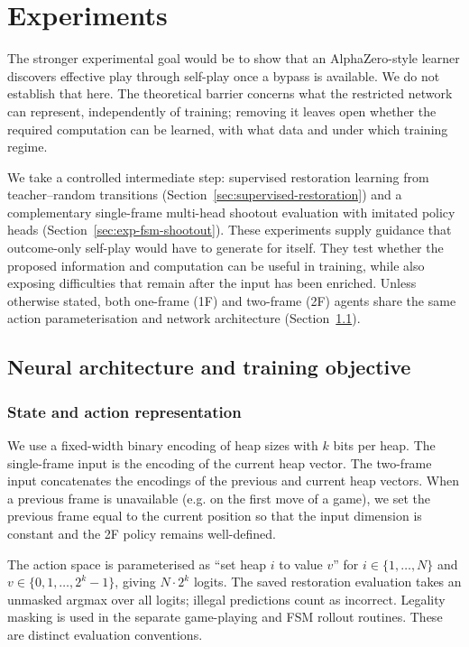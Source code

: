 \documentclass[11pt]{article}
\theoremstyle{plain}
\theoremstyle{definition}
\theoremstyle{remark}
\numberwithin{equation}{section}
\begin{document}
\section{Experiments}
\label{sec:experiments}

The stronger experimental goal would be to show that an AlphaZero-style learner discovers effective play through self-play once a bypass is available. We do not establish that here. The theoretical barrier concerns what the restricted network can represent, independently of training; removing it leaves open whether the required computation can be learned, with what data and under which training regime.

We take a controlled intermediate step: supervised restoration learning from teacher--random transitions (Section~\ref{sec:supervised-restoration}) and a complementary single-frame multi-head shootout evaluation with imitated policy heads (Section~\ref{sec:exp-fsm-shootout}). These experiments supply guidance that outcome-only self-play would have to generate for itself. They test whether the proposed information and computation can be useful in training, while also exposing difficulties that remain after the input has been enriched.
Unless otherwise stated, both one-frame (1F) and two-frame (2F) agents share the same action parameterisation and network architecture (Section~\ref{sec:arch}).

\subsection{Neural architecture and training objective}
\label{sec:arch}

\subsubsection{State and action representation}
\label{sec:state-action-repr}
We use a fixed-width binary encoding of heap sizes with $k$ bits per heap. The single-frame input is the encoding of the current heap vector. The two-frame input concatenates the encodings of the previous and current heap vectors. When a previous frame is unavailable (e.g. on the first move of a game), we set the previous frame equal to the current position so that the input dimension is constant and the 2F policy remains well-defined.

The action space is parameterised as ``set heap $i$ to value $v$'' for $i\in\{1,\dots,N\}$ and $v\in\{0,1,\dots,2^k-1\}$, giving $N\cdot 2^k$ logits. The saved restoration evaluation takes an unmasked argmax over all logits; illegal predictions count as incorrect. Legality masking is used in the separate game-playing and FSM rollout routines. These are distinct evaluation conventions.
\end{document}
